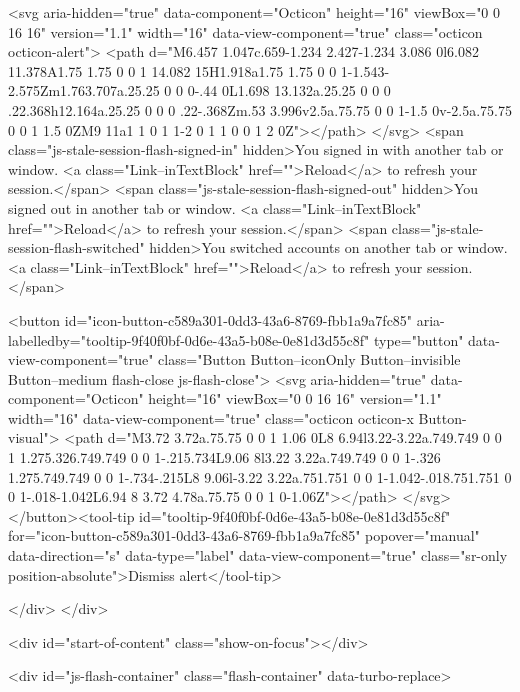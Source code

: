         <svg aria-hidden="true" data-component="Octicon" height="16" viewBox="0 0 16 16" version="1.1" width="16" data-view-component="true" class="octicon octicon-alert">
    <path d="M6.457 1.047c.659-1.234 2.427-1.234 3.086 0l6.082 11.378A1.75 1.75 0 0 1 14.082 15H1.918a1.75 1.75 0 0 1-1.543-2.575Zm1.763.707a.25.25 0 0 0-.44 0L1.698 13.132a.25.25 0 0 0 .22.368h12.164a.25.25 0 0 0 .22-.368Zm.53 3.996v2.5a.75.75 0 0 1-1.5 0v-2.5a.75.75 0 0 1 1.5 0ZM9 11a1 1 0 1 1-2 0 1 1 0 0 1 2 0Z"></path>
</svg>
        <span class="js-stale-session-flash-signed-in" hidden>You signed in with another tab or window. <a class="Link--inTextBlock" href="">Reload</a> to refresh your session.</span>
        <span class="js-stale-session-flash-signed-out" hidden>You signed out in another tab or window. <a class="Link--inTextBlock" href="">Reload</a> to refresh your session.</span>
        <span class="js-stale-session-flash-switched" hidden>You switched accounts on another tab or window. <a class="Link--inTextBlock" href="">Reload</a> to refresh your session.</span>

    <button id="icon-button-c589a301-0dd3-43a6-8769-fbb1a9a7fc85" aria-labelledby="tooltip-9f40f0bf-0d6e-43a5-b08e-0e81d3d55c8f" type="button" data-view-component="true" class="Button Button--iconOnly Button--invisible Button--medium flash-close js-flash-close">  <svg aria-hidden="true" data-component="Octicon" height="16" viewBox="0 0 16 16" version="1.1" width="16" data-view-component="true" class="octicon octicon-x Button-visual">
    <path d="M3.72 3.72a.75.75 0 0 1 1.06 0L8 6.94l3.22-3.22a.749.749 0 0 1 1.275.326.749.749 0 0 1-.215.734L9.06 8l3.22 3.22a.749.749 0 0 1-.326 1.275.749.749 0 0 1-.734-.215L8 9.06l-3.22 3.22a.751.751 0 0 1-1.042-.018.751.751 0 0 1-.018-1.042L6.94 8 3.72 4.78a.75.75 0 0 1 0-1.06Z"></path>
</svg>
</button><tool-tip id="tooltip-9f40f0bf-0d6e-43a5-b08e-0e81d3d55c8f" for="icon-button-c589a301-0dd3-43a6-8769-fbb1a9a7fc85" popover="manual" data-direction="s" data-type="label" data-view-component="true" class="sr-only position-absolute">Dismiss alert</tool-tip>


  
</div>
    </div>

  <div id="start-of-content" class="show-on-focus"></div>








    <div id="js-flash-container" class="flash-container" data-turbo-replace>




